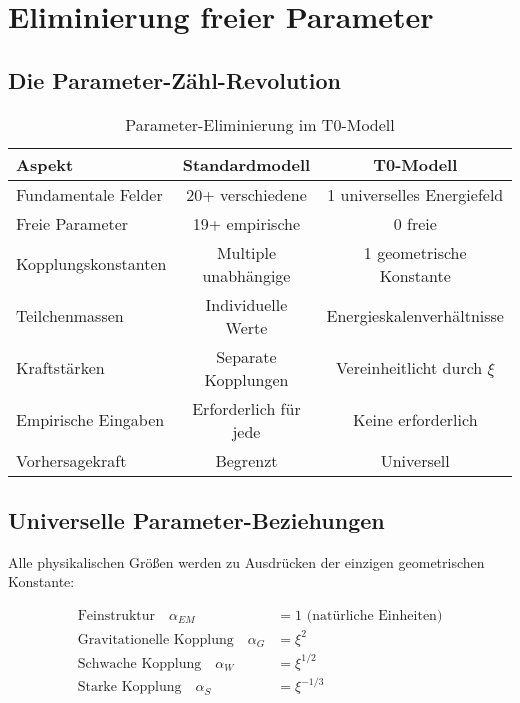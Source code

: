 \documentclass[12pt,a4paper]{report}
\begin{document}
	\section{Eliminierung freier Parameter}
	\label{sec:elimination_free_parameters}
	
	\subsection{Die Parameter-Zähl-Revolution}
	\label{subsec:parameter_count_revolution}
	
	\begin{table}[htbp]
		\centering
		\begin{tabular}{lcc}
			\toprule
			\textbf{Aspekt} & \textbf{Standardmodell} & \textbf{T0-Modell} \\
			\midrule
			Fundamentale Felder & 20+ verschiedene & 1 universelles Energiefeld \\
			Freie Parameter & 19+ empirische & 0 freie \\
			Kopplungskonstanten & Multiple unabhängige & 1 geometrische Konstante \\
			Teilchenmassen & Individuelle Werte & Energieskalenverhältnisse \\
			Kraftstärken & Separate Kopplungen & Vereinheitlicht durch $\xi$ \\
			Empirische Eingaben & Erforderlich für jede & Keine erforderlich \\
			Vorhersagekraft & Begrenzt & Universell \\
			\bottomrule
		\end{tabular}
		\caption{Parameter-Eliminierung im T0-Modell}
		\label{tab:parameter_elimination}
	\end{table}
	
	\subsection{Universelle Parameter-Beziehungen}
	\label{subsec:universal_parameter_relations}
	
	Alle physikalischen Größen werden zu Ausdrücken der einzigen geometrischen Konstante:
	
	\begin{align}
		\text{Feinstruktur} \quad \alpha_{EM} &= 1 \text{ (natürliche Einheiten)} \\
		\text{Gravitationelle Kopplung} \quad \alpha_G &= \xi^2 \\
		\text{Schwache Kopplung} \quad \alpha_W &= \xi^{1/2} \\
		\text{Starke Kopplung} \quad \alpha_S &= \xi^{-1/3}
	\end{align}
	
\end{document}
